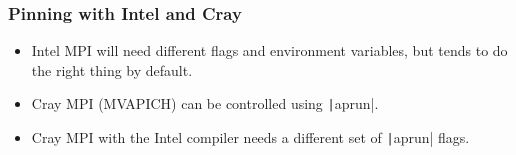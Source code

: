 \documentclass{beamer}
\begin{document}
\begin{frame}
\frametitle{Pinning with Intel and Cray}
\begin{itemize}
  \item Intel MPI will need different flags and environment variables, but tends to do the right thing by default.
  \item Cray MPI (MVAPICH) can be controlled using \texttt|aprun|.
  \item Cray MPI with the Intel compiler needs a different set of \texttt|aprun| flags.
\end{itemize}
\end{frame}

\end{document}
